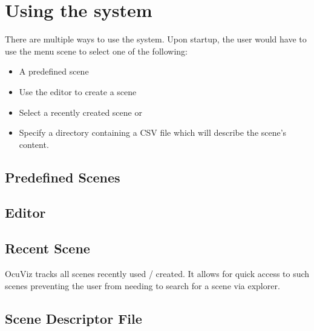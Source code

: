 \documentclass[a4paper,12pt]{article}
\begin{document}
\section{Using the system}

There are multiple ways to use the system. Upon startup, the user would have to use the menu scene to select one of the following:

\begin{itemize}
\item A predefined scene
\item Use the editor to create a scene
\item Select a recently created scene or
\item Specify a directory containing a CSV file which will describe the scene's content.
\end{itemize}

\subsection{Predefined Scenes}


\subsection{Editor}


\subsection{Recent Scene}
OcuViz tracks all scenes recently used / created. It allows for quick access to such scenes preventing the user from needing to search for a scene via explorer.

\subsection{Scene Descriptor File}
\end{document}
